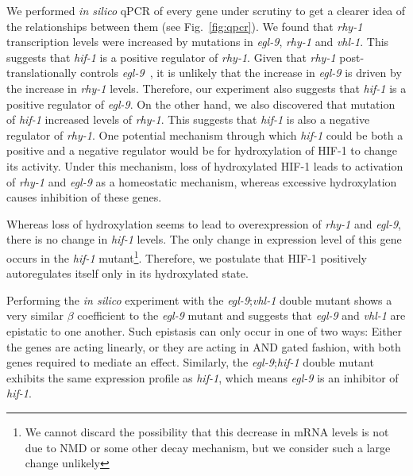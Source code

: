 \documentclass[9pt,twocolumn,twoside]{pnas-new}
\newcommand{\egl}{\emph{egl-9}}
\newcommand{\rhy}{\emph{rhy-1}}
\newcommand{\vhl}{\emph{vhl-1}}
\newcommand{\hif}{\emph{hif-1}}
\newcommand{\hifp}{HIF-1}
\begin{document}
We performed \emph{in silico} qPCR of every gene under scrutiny to get a clearer idea of the relationships between them (see Fig.~\ref{fig:qpcr}). We found that \rhy{} transcription levels were increased by mutations in \egl{}, \rhy{} and \vhl{}. This suggests that \hif{} is a positive regulator of \rhy{}.
Given that \rhy{} post-translationally controls \egl{}~\cite{Ma2012}, it is unlikely that the increase in \egl{} is driven by the increase in \rhy{} levels. Therefore, our experiment also suggests that \hif{} is a positive regulator of \egl{}. On the other hand, we also discovered that mutation of \hif{} increased levels of \rhy{}. This suggests that \hif{} is also a negative regulator of \rhy{}. One potential mechanism through which \hif{} could be both a positive and a negative regulator would be for hydroxylation of \hifp{} to change its activity. Under this mechanism, loss of hydroxylated \hifp{} leads to activation of \rhy{} and \egl{} as a homeostatic mechanism, whereas excessive hydroxylation causes inhibition of these genes.

Whereas loss of hydroxylation seems to lead to overexpression of \rhy{} and \egl{}, there is no change in \hif{} levels. The only change in expression level of this gene occurs in the \hif{} mutant\footnote{We cannot discard the possibility that this decrease in mRNA levels is not due to NMD or some other decay mechanism, but we consider such a large change unlikely}. Therefore, we postulate that \hifp{} positively autoregulates itself only in its hydroxylated state.

Performing the \emph{in silico} experiment with the \egl{};\vhl{} double mutant shows a very similar $\beta$ coefficient to the \egl{} mutant and suggests that \egl{} and \vhl{} are epistatic to one another. Such epistasis can only occur in one of two ways: Either the genes are acting linearly, or they are acting in AND gated fashion, with both genes required to mediate an effect. Similarly, the \egl{};\hif{} double mutant exhibits the same expression profile as \hif{}, which means \egl{} is an inhibitor of \hif{}.
\end{document}
